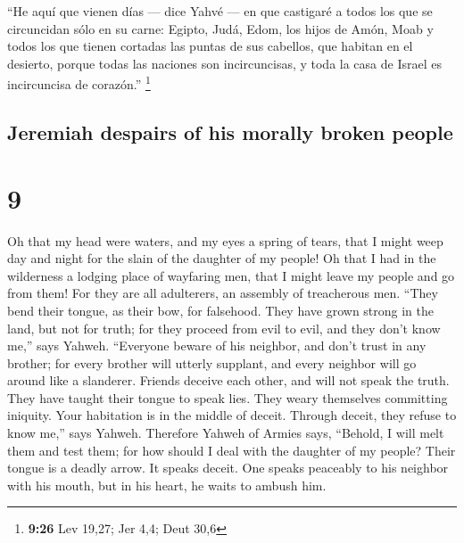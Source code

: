 \begin{paracol}{2}
 ``He aquí que vienen días --- dice Yahvé --- en que
castigaré a todos los que se circuncidan sólo en su carne:
 Egipto, Judá, Edom, los hijos de Amón, Moab y todos los
que tienen cortadas las puntas de sus cabellos, que habitan en el
desierto, porque todas las naciones son incircuncisas, y toda la casa de
Israel es incircuncisa de corazón.'' \footnote{\textbf{9:26} Lev 19,27;
  Jer 4,4; Deut 30,6}

\switchcolumn
\begin{otherlanguage}{english}

\hypertarget{jeremiah-despairs-of-his-morally-broken-people}{%
\subsection{Jeremiah despairs of his morally broken
people}\label{jeremiah-despairs-of-his-morally-broken-people}}

\hypertarget{section-17}{%
\section{9}\label{section-17}}

 Oh that my head were waters, and my eyes a spring of
tears, that I might weep day and night for the slain of the daughter of
my people!  Oh that I had in the wilderness a lodging
place of wayfaring men, that I might leave my people and go from them!
For they are all adulterers, an assembly of treacherous men.
 ``They bend their tongue, as their bow, for falsehood.
They have grown strong in the land, but not for truth; for they proceed
from evil to evil, and they don't know me,'' says Yahweh. 
``Everyone beware of his neighbor, and don't trust in any brother; for
every brother will utterly supplant, and every neighbor will go around
like a slanderer.  Friends deceive each other, and will
not speak the truth. They have taught their tongue to speak lies. They
weary themselves committing iniquity.  Your habitation is
in the middle of deceit. Through deceit, they refuse to know me,'' says
Yahweh.  Therefore Yahweh of Armies says, ``Behold, I will
melt them and test them; for how should I deal with the daughter of my
people?  Their tongue is a deadly arrow. It speaks deceit.
One speaks peaceably to his neighbor with his mouth, but in his heart,
he waits to ambush him.

\hypertarget{the-lament-of-the-prophet-gods-judgment-wailing}{%
}
\end{otherlanguage}
\end{paracol}
